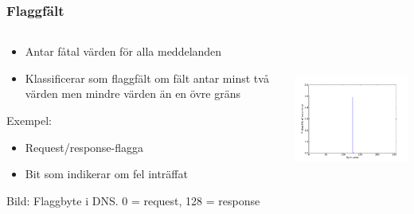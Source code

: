 \documentclass[xetex, 8pt]{beamer}
\begin{document}
    \begin{frame}
        \frametitle{Flaggfält}
        \begin{columns}[t]
            \begin{column}[T]{6cm}
                \begin{itemize}
                    \item Antar fåtal värden för alla meddelanden
                    \item Klassificerar som flaggfält om fält antar minst
                        två värden men mindre värden än en övre gräns
                \end{itemize}
                Exempel:
                \begin{itemize}
                    \item Request/response-flagga
                    \item Bit som indikerar om fel inträffat
                \end{itemize}
                Bild: Flaggbyte i DNS. 0 = request, 128 = response
            \end{column}
            \begin{column}[T]{6cm}
                \includegraphics[height=5cm]{img/flag.pdf}
            \end{column}
        \end{columns}
    \end{frame}
\end{document}
